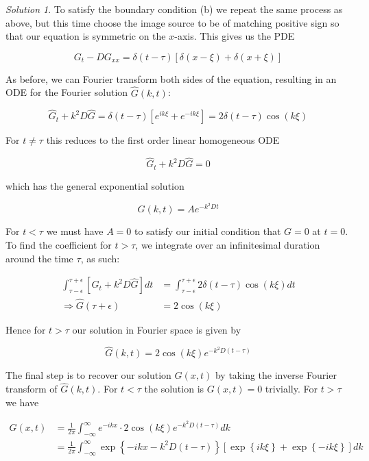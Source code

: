 \documentclass[12pt,a4paper]{article}
\theoremstyle{definition}
\theoremstyle{remark}
\newtheorem*{solution}{Solution}
\begin{document}
\begin{solution}
    To satisfy the boundary condition (b) we repeat the same process as above, but this time choose the image source to be of matching positive sign so that our equation is symmetric on the $x$-axis. This gives us the PDE 

    $$G_t - DG_{xx} = \delta(t-\tau)\left[ \delta(x-\xi)+\delta(x+\xi)\right]$$

    As before, we can Fourier transform both sides of the equation, resulting in an ODE for the Fourier solution $\hat G(k,t)$:

    $$\hat G_t + k^2 D \hat G = \delta(t-\tau)\left[ e^{ik\xi} + e^{-ik\xi}\right] = 2 \delta(t-\tau) \cos(k\xi)$$

    For $t\ne \tau$ this reduces to the first order linear homogeneous ODE 

    $$\hat G_t + k^2 D\hat G = 0$$

    which has the general exponential solution 

    $$\hat G(k,t) = A e^{- k^2 D t}$$

    For $t< \tau$ we must have $A=0$ to satisfy our initial condition that $G=0$ at $t=0$. To find the coefficient for $t>\tau$, we integrate over an infinitesimal duration around the time $\tau$, as such:

    \begin{align*}
        \int_{\tau-\epsilon}^{\tau + \epsilon} \left[ \hat G_t + k^2 D \hat G \right] dt &= \int_{\tau-\epsilon}^{\tau+\epsilon} 2 \delta(t-\tau) \cos(k\xi) dt \\
        \Rightarrow \hat G(\tau + \epsilon) &= 2 \cos(k\xi)
    \end{align*}

    Hence for $t>\tau$ our solution in Fourier space is given by 

    $$\hat G(k,t) = 2\cos(k\xi) e^{-k^2 D (t-\tau)}$$

    The final step is to recover our solution $G(x,t)$ by taking the inverse Fourier transform of $\hat G(k,t)$. For $t< \tau$ the solution is $G(x,t)=0$ trivially. For $t>\tau$ we have 

    \begin{align*}
        G(x,t) &= \frac{1}{2\pi} \int_{-\infty}^\infty e^{-ikx} \cdot 2 \cos(k\xi) e^{-k^2 D(t-\tau)} dk\\
        &= \frac{1}{2\pi} \int_{-\infty}^\infty \exp \left\{-ikx -k^2 D(t-\tau) \right\} \left[ \exp\left\{ ik\xi \right\} + \exp\left\{ -ik\xi \right\} \right] dk
    \end{align*}


\end{solution}
\end{document}
